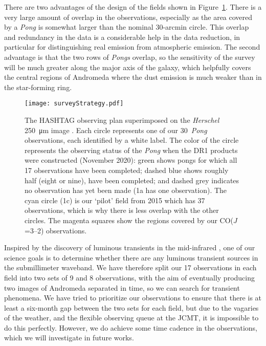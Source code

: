 \documentclass[a4paper,fleqn,usenatbib, twocolumn]{aastex63}
\begin{document}
There are two advantages of the design of the fields shown in Figure~\ref{fig:surveyStrategy}. There is a very large amount of
overlap in the observations, especially as the area covered by
a {\it Pong} is somewhat larger than the nominal 30-arcmin circle. This overlap
and redundancy in the data is a considerable help in the data reduction, in particular for
distinguishing real emission from atmospheric emission. The second advantage
is that the two rows of {\it Pongs} overlap, so the sensitivity of the survey will
be much greater along the major axis of the galaxy, which helpfully covers the
central regions of Andromeda where the dust emission
is much weaker than in the star-forming ring.


\begin{figure}
  \centering
  \texttt{[image: surveyStrategy.pdf]}
  \caption{The HASHTAG observing plan superimposed on the {\it Herschel} \SI{250}{\micro\meter} image \citep{smith2012}. Each circle represents one of our 30\arcmin\ {\it Pong} observations, each identified by a white label. The color of the circle represents the observing status of the {\it Pong} when the DR1 products were 
           constructed (November 2020):
           green shows pongs for which all 17 observations have been completed; dashed blue shows 
           roughly half (eight or nine), have been completed; and dashed grey indicates no observation has yet been made (1a has one observation). The cyan circle (1c) is our `pilot' field from 2015 which has 37 observations, which is why there
    	   is less overlap with the other circles. The magenta squares show the regions covered by our CO($J$=3--2) observations.}
  \label{fig:surveyStrategy}
\end{figure}

Inspired by the discovery of luminous transients in the mid-infrared \citep{kasliwal2017}, one of our science goals is to determine whether there
are any luminous transient sources in the submillimeter waveband. We have therefore
split our 17 observations in each field into two sets of 9 and 8 observations,
with the aim of eventually producing two images of Andromeda separated in time, so
we can search for transient phenomena. We have tried to prioritize our
observations to ensure that there is at least a six-month gap between the two sets for
each field, but due to the vagaries of the weather, and the flexible observing queue at the JCMT, 
it is impossible to do this perfectly. However, we  do achieve some time cadence in the observations, which
we will investigate in future works.
\end{document}
